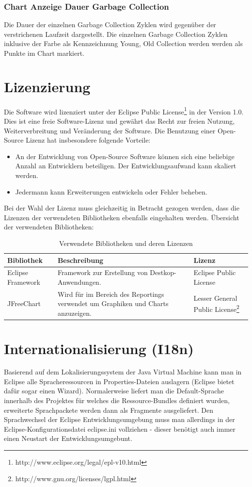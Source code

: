 \subsubsection{Chart Anzeige Dauer Garbage Collection}
Die Dauer der einzelnen Garbage Collection Zyklen wird gegenüber der verstrichenen Laufzeit dargestellt. Die einzelnen Garbage Collection Zyklen inklusive der Farbe als Kennzeichnung Young, Old Collection werden werden als Punkte im Chart markiert.


\section{Lizenzierung}
Die Software wird lizenziert unter der Eclipse Public License\footnote{http://www.eclipse.org/legal/epl-v10.html} in der Version 1.0. Dies ist eine freie Software-Lizenz und gewährt das Recht zur freien Nutzung, Weiterverbreitung und Veränderung der Software. Die Benutzung einer Open-Source Lizenz hat insbesondere folgende Vorteile:
\begin{itemize}
	\item An der Entwicklung von Open-Source Software können sich eine beliebige Anzahl an Entwicklern beteiligen. Der Entwicklungsaufwand kann skaliert werden.
	\item Jedermann kann Erweiterungen entwickeln oder Fehler beheben.
\end{itemize}

Bei der Wahl der Lizenz muss gleichzeitig in Betracht gezogen werden, dass die Lizenzen der verwendeten Bibliotheken ebenfalls eingehalten werden. Übersicht der verwendeten Bibliotheken:

\begin{longtable}{|p{3cm}|p{7cm}|p{4cm}|}
    \caption{Verwendete Bibliotheken und deren Lizenzen}\\\hline
	\textbf{Bibliothek} & \textbf{Beschreibung}  & \textbf{Lizenz}\\\hline
	Eclipse Framework & Framework zur Erstellung von Destkop-Anwendungen. & Eclipse Public License\\\hline 
	JFreeChart & Wird für im Bereich des Reportings verwendet um Graphiken und Charts anzuzeigen. & Lesser General Public License\footnote{http://www.gnu.org/licenses/lgpl.html}\\\hline
\end{longtable}



\section{Internationalisierung (I18n)}
Basierend auf dem Lokalisierungssystem der Java Virtual Machine kann man in Eclipse alle Spracheressourcen in Properties-Dateien auslagern (Eclipse bietet dafür sogar einen Wizard). Normalerweise liefert man die Default-Sprache innerhalb des Projektes für welches die Ressource-Bundles definiert wurden, erweiterte Sprachpackete werden dann als Fragmente ausgeliefert. Den Sprachwechsel der Eclipse Entwicklungsumgebung muss man allerdings in der Eclipse-Konfigurationsdatei eclipse.ini vollziehen - dieser benötigt auch immer einen Neustart der Entwicklungsumgebunt.

